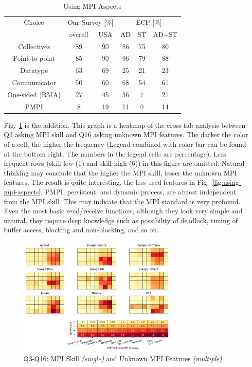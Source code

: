 \documentclass[conference,10pt,letterpaper]{IEEEtran}
\begin{document}
\begin{table}[htb]%
  \begin{center}%
    \caption{Using MPI Aspects}\label{tab:using-mpi-aspects}%
    \begin{tabular}{c||c|c||c|c|c}%
      \hline%
      Choice & \multicolumn{2}{c||}{Our Survey [\%]} &
      \multicolumn{3}{c}{ECP [\%]} \\
      \cline{2-6}%
      & overall & USA & AD & ST & AD+ST \\
      \hline%
      Collectives & 89 & 90 & 86 & 75 & 80 \\
      Point-to-point & 85 & 90 & 96 & 79 & 88 \\
      Datatype & 63 & 69 & 25 & 21 & 23 \\
      Communicator & 50 & 60 & 68 & 54 & 61 \\
      One-sided (RMA) & 27 & 45 & 36 & 7 & 21 \\
      PMPI & 8 & 19 & 11 & 0 & 14 \\
      \hline%
    \end{tabular}%
  \end{center}%
\end{table}%

Fig.~\ref{fig:skill-and-aspects} is the addition. This graph is a
heatmap of the cross-tab analysis between Q3 asking MPI skill and Q16
asking unknown MPI features. The darker the color of a cell, the
higher the frequency (Legend combined with color bar can be found at
the bottom right. The numbers in the legend cells are
percentage). Less frequent 
rows (skill low (1) and skill high (6)) in this figure are
omitted. Natural thinking may conclude 
that the higher the MPI skill, lesser the unknown MPI features. The
result is quite interesting, the less used features in
Fig.~\ref{fig:using-mpi-aspects}, PMPI, persistent, and dynamic
process, are almost independent from the MPI skill. This may indicate
that the MPI standard is very profound. Even the most basic
send/receive functions, although they look very simple and natural,
they require deep knowledge such as possibility of deadlock, timing of
buffer access, blocking and non-blocking, and so on.

\begin{figure}[htb]
  \begin{center}
    \includegraphics[width=8cm]{Figs/Q3-Q16.pdf}
    \caption{Q3-Q16: MPI Skill {\it(single)} and Unknown MPI Features {\it(multiple)}}
    \label{fig:skill-and-aspects}
  \end{center}
\end{figure}
\end{document}
